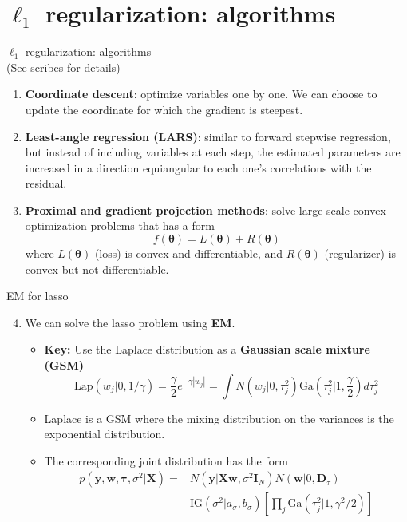 \documentclass[10pt,mathserif]{beamer}
\begin{document}
\section{$\ell_1$ regularization: algorithms}
\begin{frame}{$\ell_1$ regularization: algorithms\\[-0.3em] 
{\footnotesize \textmd{(See scribes for details)}}}
    \begin{enumerate}
        \item \textbf{Coordinate descent}: optimize variables one by one. We can choose to update the coordinate for which the gradient is steepest.
        \item \textbf{Least-angle regression (LARS)}: similar to forward stepwise regression, but instead of including variables at each step, the estimated parameters are increased in a direction equiangular to each one's correlations with the residual. 
        \item \textbf{Proximal and gradient projection methods}: solve large scale convex optimization problems that has a form
        \begin{equation*}
            f(\bm{\theta}) = L(\bm{\theta}) + R(\bm{\theta})
        \end{equation*}
        where $L(\bm{\theta})$ (loss) is convex and differentiable, and $R(\bm{\theta})$ (regularizer) is convex but not differentiable.
    \end{enumerate}
\end{frame}

\begin{frame}{EM for lasso}
\begin{enumerate}
\setcounter{enumi}{3}
    \item We can solve the lasso problem using \textbf{EM}.
    \begin{itemize}
    \item \textbf{Key:} Use the Laplace distribution as a \textbf{Gaussian scale mixture (GSM)}
    \begin{equation*}
        \text{Lap}(w_j|0,1/\gamma) = \frac{\gamma}{2} e^{-\gamma|w_j|} = \int N(w_j |0, \tau_j^2 ) \text{Ga}(\tau_j^2 |1, \frac{\gamma}{2} )d\tau_j^2
    \end{equation*}
    \item Laplace is a GSM where the mixing distribution on the variances is the exponential distribution.
    \item The corresponding joint distribution has the form
    \begin{equation*}
        \begin{split}
            p(\bm{y},\bm{w},\bm{\tau},\sigma^2|\bm{X}) 
            = & N(\bm{y}|\bm{X}\bm{w},\sigma^2 \bm{I}_N) N(\bm{w}|0,\bm{D}_\tau)\\
              & \text{IG}(\sigma^2|a_\sigma, b_\sigma)[\prod_j\text{Ga}(\tau_j^2|1,\gamma^2/2)]
        \end{split}
    \end{equation*}  
    \end{itemize}
\end{enumerate}
\end{frame}
\end{document}

